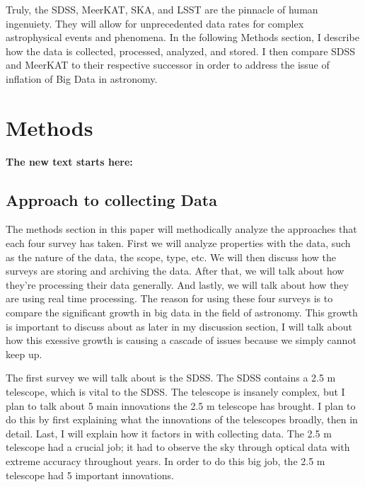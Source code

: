 \documentclass[preprint,linenumbers, longauthor]{aastex631}
\begin{document}
Truly, the SDSS, MeerKAT, SKA, and LSST are the pinnacle of human ingenuiety. They will allow for unprecedented data rates for complex astrophysical events and phenomena.
In the following Methods section, I describe how the data is collected, processed, analyzed, and stored. I then compare SDSS and MeerKAT to their respective successor in order to address the issue of inflation of Big Data in astronomy.


\section{Methods}


\textbf{The new text starts here:}
\subsection{Approach to collecting Data}
The methods section in this paper will methodically analyze the approaches that each four survey has taken.
First we will analyze properties with the data, such as the nature of the data, the scope, type, etc.
We will then discuss how the surveys are storing and archiving the data.
After that, we will talk about how they're processing their data generally.
And lastly, we will talk about how they are using real time processing.
The reason for using these four surveys is to compare the significant growth in big data in the field of astronomy.
This growth is important to discuss about as later in my discussion section, I will talk about how this exessive growth is
causing a cascade of issues because we simply cannot keep up.


The first survey we will talk about is the SDSS. The SDSS contains a 2.5 m telescope, which is vital to the SDSS.
The telescope is insanely complex, but I plan to talk about 5 main innovations the 2.5 m telescope has brought. I plan to do this by first explaining what the innovations of the telescopes broadly, then in detail. Last, I will explain how it factors in with collecting data.
The 2.5 m telescope had a crucial job; it had to observe the sky through optical data with extreme accuracy throughout years.
In order to do this big job, the 2.5 m telescope had 5 important innovations. 
\end{document}
